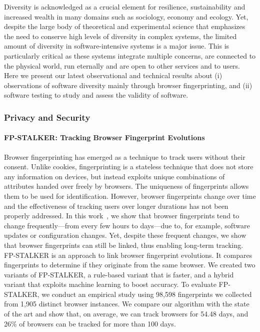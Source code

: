 Diversity is acknowledged as a crucial element for resilience, sustainability and increased wealth in many domains such as  sociology, economy and ecology. 
Yet, despite the large body of theoretical and experimental science that emphasizes the need to conserve high levels of diversity in complex systems, the limited amount of diversity in software-intensive systems is a major issue. 
This  is particularly critical as these systems integrate multiple concerns, are connected to the physical world, run eternally and are open to other services and to users.
Here we present our latest observational and technical results about (i) observations of software diversity mainly through browser fingerprinting, and (ii) software testing to study and assess the validity of software. 

\subsubsection{Privacy and Security}

\paragraph{FP-STALKER: Tracking Browser Fingerprint Evolutions}

Browser fingerprinting has emerged as a technique to track users without their consent. Unlike cookies, fingerprinting is a stateless technique that does not store any information on devices, but instead exploits unique combinations of attributes handed over freely by browsers. The uniqueness of fingerprints allows them to be used for identification. However, browser fingerprints change over time and the effectiveness of tracking users over longer durations has not been properly addressed. In this work~\cite{vastel:hal-01652021}, we show that browser fingerprints tend to change frequently—from every few hours to days—due to, for example, software updates or configuration changes. Yet, despite these frequent changes, we show that browser fingerprints can still be linked, thus enabling long-term tracking. FP-STALKER is an approach to link browser fingerprint evolutions. It compares fingerprints to determine if they originate from the same browser. We created two variants of FP-STALKER, a rule-based variant that is faster, and a hybrid variant that exploits machine learning to boost accuracy. To evaluate FP-STALKER, we conduct an empirical study using 98,598 fingerprints we collected from 1,905 distinct browser instances. We compare our algorithm with the state of the art and show that, on average, we can track browsers for 54.48 days, and 26\% of browsers can be tracked for more than 100 days. 
 

